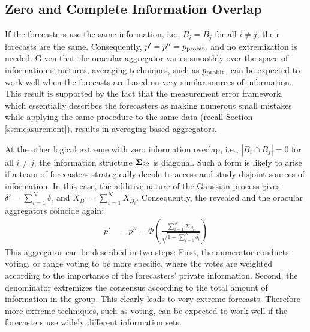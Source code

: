 \documentclass[12pt]{article}
\theoremstyle{definition}
\theoremstyle{definition}
\def\probit{p_{\rm probit}}
\begin{document}
\subsection{Zero and Complete Information Overlap}
\label{disjoint}
If the forecasters use the same information, i.e.,   $B_{i} = B_j$ for all $i \neq j$, their forecasts are the same. Consequently, $p' = p'' = \probit,$
and no
extremization is needed. Given that the oracular aggregator varies
smoothly over the space of information structures, averaging
techniques, such as $\probit$, can be expected to work
well when the forecasts are based on very similar sources of
information. This result is supported by the fact that the
measurement error framework, which essentially describes the
forecasters as making numerous small mistakes while applying the same
procedure to the same data (recall Section \ref{ss:measurement}),
results in averaging-based aggregators.





At the other logical extreme with zero information overlap, i.e.,  $|B_{i} \cap B_{j}| = 0$ for all $i \neq j$, the information structure ${\bf\Sigma}_{22}$ is
diagonal. Such a form is likely to arise if a team of forecasters
strategically decide to access and study disjoint sources of
information. In this case, the additive nature of the Gaussian process gives $\delta' = \sum_{i=1}^N \delta_i$ and $X_{B'} = \sum_{i=1}^N X_{B_i}$. Consequently, the revealed and  the oracular aggregators coincide again:
 \begin{align*}
p' &= p'' =  \Phi\left( \frac{\sum_{i=1}^N X_{B_i}}
  {\sqrt{1- \sum_{i=1}^N \delta_i}} \right) 
\end{align*}
This aggregator can be described in two steps: First, the numerator conducts voting, or range voting to be more specific, where the votes are weighted according to
the importance of the forecasters' private information. Second, the
denominator extremizes the consensus according to the total
amount of information in the group. This clearly leads to very extreme forecasts. Therefore
more extreme techniques, such as voting, can be expected to work well
if the forecasters use widely different information sets.
\end{document}
